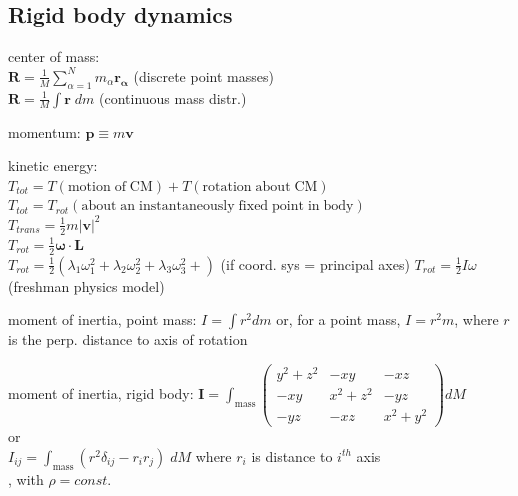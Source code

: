 \documentclass[letterpaper,landscape,10pt]{article}
\newenvironment{mydescription}
{\begin{description}
	\setlength{\itemsep}{0pt}
	\setlength{\parskip}{0pt}
	\setlength{\parsep}{-1pt}}
{\end{description}}
\begin{document}
{\begin{multicols}{4}
	\subsection*{Rigid body dynamics}
		\begin{mydescription}
		  	\item[center of mass:] \ \\
			  $\bm{R} = \frac{1}{M}\sum_{\alpha=1}^Nm_\alpha\bm{r_\alpha}$ \hspace{5pt}(discrete point masses)\\
			  $\bm{R} = \frac{1}{M}\int\bm{r}\; dm$ \hspace{5pt}(continuous mass distr.)
			\item[momentum:] $\bm{p}\equiv m\bm{v}$
			\item[kinetic energy:] \ \\
			  $T_{tot} = T\mathrm{(motion\;of\;CM)}+T\mathrm{(rotation\;about\;CM)}$ \\
			  $T_{tot} = T_{rot}\mathrm{(about\;an\;instantaneously\;fixed\;point\;in\;body)}$ \\
	    	  $T_{trans} = \frac{1}{2}m|\bm{v}|^2$  \\
			  $T_{rot} = \frac{1}{2}\bm{\omega}\cdot\bm{L}$ \\
			  $T_{rot} = \frac{1}{2}\left( \lambda_1\omega_1^2 +
			  \lambda_2\omega_2^2 +  \lambda_3\omega_3^2 + \right)$ (if coord.
			  sys = principal axes)
			  $T_{rot} = \frac{1}{2}I\omega$ (freshman physics model)
			\item[moment of inertia, point mass:]
				$I = \int r^2dm$ or, for a point mass, $I = r^2m$, where $r$ is
				the perp. distance to axis of rotation  \\
			\item[moment of inertia, rigid body:]
			  $\bm{I}  = \int_{\mathrm{mass}} \begin{pmatrix} y^2+z^2 & -xy & -xz \\ -xy &
				x^2+z^2 & -yz \\ -yz & -xz & x^2+y^2 \end{pmatrix} dM $ \\
				or \\
				$I_{ij} = \int_{\mathrm{mass}} \left( r^2\delta_{ij}-r_i r_j \right)\;dM$\hspace{5pt} where $r_i$ is distance to $i^{th}$ axis \\
				, with $\rho=const.$ \\

\end{mydescription}
\end{multicols}}
\end{document}
